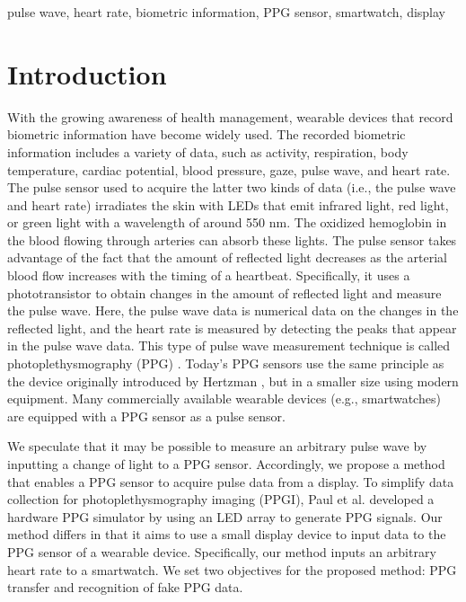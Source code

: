 \documentclass{ieeeaccess}
\begin{document}
\begin{keywords}
pulse wave, heart rate, biometric information, PPG sensor, smartwatch, display
\end{keywords}

\titlepgskip=-15pt

\maketitle

\section{Introduction}
\label{sec:introduction}
With the growing awareness of health management, wearable devices that record biometric information have become widely used. The recorded biometric information includes a variety of data, such as activity, respiration, body temperature, cardiac potential, blood pressure, gaze, pulse wave, and heart rate. The pulse sensor used to acquire the latter two kinds of data (i.e., the pulse wave and heart rate) irradiates the skin with LEDs that emit infrared light, red light, or green light with a wavelength of around 550 nm. The oxidized hemoglobin in the blood flowing through arteries can absorb these lights. The pulse sensor takes advantage of the fact that the amount of reflected light decreases as the arterial blood flow increases with the timing of a heartbeat. Specifically, it uses a phototransistor to obtain changes in the amount of reflected light and measure the pulse wave. Here, the pulse wave data is numerical data on the changes in the reflected light, and the heart rate is measured by detecting the peaks that appear in the pulse wave data. This type of pulse wave measurement technique is called photoplethysmography (PPG) \cite{ppg}. Today's PPG sensors use the same principle as the device originally introduced by Hertzman \cite{ppg_principle1, ppg_principle2}, but in a smaller size using modern equipment. Many commercially available wearable devices (e.g., smartwatches) are equipped with a PPG sensor as a pulse sensor.\par

We speculate that it may be possible to measure an arbitrary pulse wave by inputting a change of light to a PPG sensor. Accordingly, we propose a method that enables a PPG sensor to acquire pulse data from a display. To simplify data collection for photoplethysmography imaging (PPGI), Paul et al. \cite{ppg_generator} developed a hardware PPG simulator by using an LED array to generate PPG signals. Our method differs in that it aims to use a small display device to input data to the PPG sensor of a wearable device. Specifically, our method inputs an arbitrary heart rate to a smartwatch. We set two objectives for the proposed method: PPG transfer and recognition of fake PPG data.\par
\end{document}
